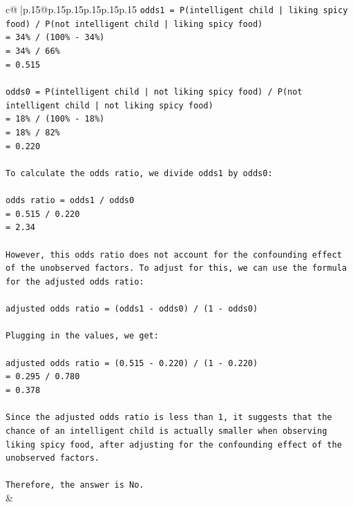 \documentclass{article}
\begin{document}
{\begin{supertabular}{c@{$\;$}|p{.15\linewidth}@{}p{.15\linewidth}p{.15\linewidth}p{.15\linewidth}p{.15\linewidth}p{.15\linewidth}}
{{{\texttt{odds1 = P(intelligent child | liking spicy food) / P(not intelligent child | liking spicy food)} \\
\texttt{= 34\% / (100\% {-} 34\%)} \\
\texttt{= 34\% / 66\%} \\
\texttt{= 0.515} \\
\\ 
\texttt{odds0 = P(intelligent child | not liking spicy food) / P(not intelligent child | not liking spicy food)} \\
\texttt{= 18\% / (100\% {-} 18\%)} \\
\texttt{= 18\% / 82\%} \\
\texttt{= 0.220} \\
\\ 
\texttt{To calculate the odds ratio, we divide odds1 by odds0:} \\
\\ 
\texttt{odds ratio = odds1 / odds0} \\
\texttt{= 0.515 / 0.220} \\
\texttt{= 2.34} \\
\\ 
\texttt{However, this odds ratio does not account for the confounding effect of the unobserved factors. To adjust for this, we can use the formula for the adjusted odds ratio:} \\
\\ 
\texttt{adjusted odds ratio = (odds1 {-} odds0) / (1 {-} odds0)} \\
\\ 
\texttt{Plugging in the values, we get:} \\
\\ 
\texttt{adjusted odds ratio = (0.515 {-} 0.220) / (1 {-} 0.220)} \\
\texttt{= 0.295 / 0.780} \\
\texttt{= 0.378} \\
\\ 
\texttt{Since the adjusted odds ratio is less than 1, it suggests that the chance of an intelligent child is actually smaller when observing liking spicy food, after adjusting for the confounding effect of the unobserved factors.} \\
\\ 
\texttt{Therefore, the answer is No.} \\
            }
        }
    }
    & \\ \\


\end{supertabular}}
\end{document}

